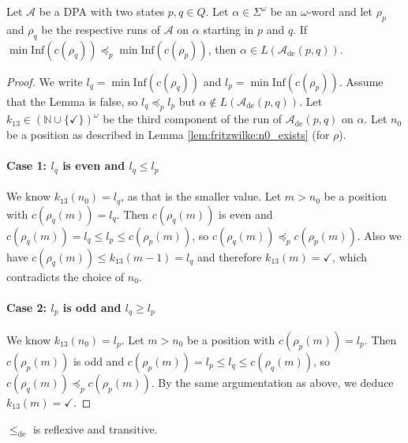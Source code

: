 \begin{lem}
\label{lem:fritzwilke:run_goodness_implies_de}
	Let $\mathcal{A}$ be a DPA with two states $p, q \in Q$. Let $\alpha \in \Sigma^\omega$ be an $\omega$-word and let $\rho_p$ and $\rho_q$ be the respective runs of $\mathcal{A}$ on $\alpha$ starting in $p$ and $q$. If $\min \text{Inf}(c(\rho_q)) \preceq_p \min \text{Inf}(c(\rho_p))$, then $\alpha \in L(\mathcal{A}_\text{de}(p, q))$.
\end{lem}

\begin{proof}
	We write $l_q = \min \text{Inf}(c(\rho_q))$ and $l_p = \min \text{Inf}(c(\rho_p))$. Assume that the Lemma is false, so $l_q \preceq_p l_p$ but $\alpha \notin L(\mathcal{A}_\text{de}(p, q))$. Let $k_{13} \in (\mathbb{N} \cup \{\checkmark\})^\omega$ be the third component of the run of $\mathcal{A}_\text{de}(p, q)$ on $\alpha$. Let $n_0$ be a position as described in Lemma \ref{lem:fritzwilke:n0_exists} (for $\rho$). 
	
	\paragraph{Case 1: $l_q$ is even and $l_q \leq l_p$} We know $k_{13}(n_0) = l_q$, as that is the smaller value. Let $m > n_0$ be a position with $c(\rho_q(m)) = l_q$. Then $c(\rho_q(m))$ is even and $c(\rho_q(m)) = l_q \leq l_p \leq c(\rho_p(m))$, so $c(\rho_q(m)) \preceq_p c(\rho_p(m))$. Also we have $c(\rho_q(m)) \leq k_{13}(m-1) = l_q$ and therefore $k_{13}(m) = \checkmark$, which contradicts the choice of $n_0$.
	
	\paragraph{Case 2: $l_p$ is odd and $l_q \geq l_p$} We know $k_{13}(n_0) = l_p$. Let $m > n_0$ be a position with $c(\rho_p(m)) = l_p$. Then $c(\rho_p(m))$ is odd and $c(\rho_p(m)) = l_p \leq l_q \leq c(\rho_q(m))$, so $c(\rho_q(m)) \preceq_p c(\rho_p(m))$. By the same argumentation as above, we deduce $k_{13}(m) = \checkmark$.
\end{proof}

\begin{lem}
\label{lem:fritzwilke:de_order_reftran}
	$\leq_\text{de}$ is reflexive and transitive.
\end{lem}

